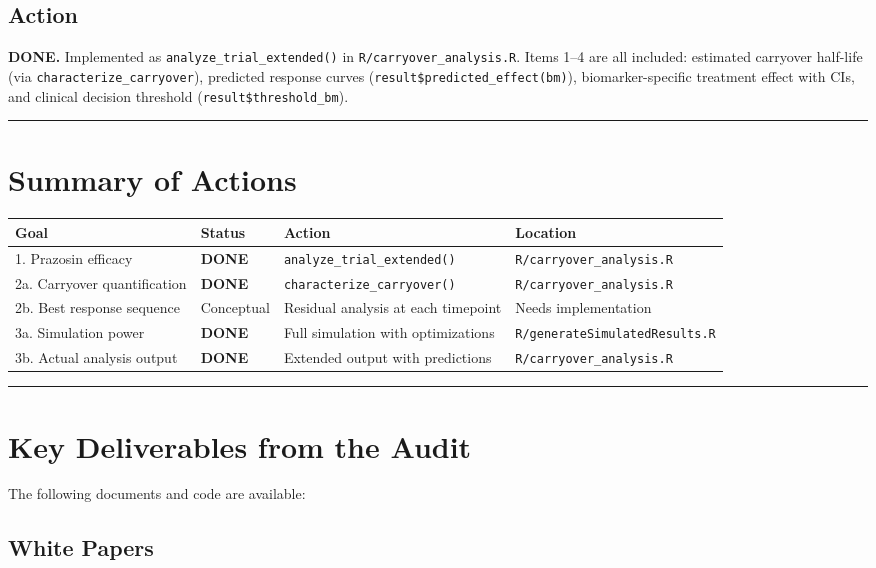\documentclass[11pt]{article}
\begin{document}
\subsection{Action}

\textbf{DONE.} Implemented as \texttt{analyze\_trial\_extended()} in
\texttt{R/carryover\_analysis.R}. Items 1--4 are all included:
estimated carryover half-life (via \texttt{characterize\_carryover}),
predicted response curves (\texttt{result\$predicted\_effect(bm)}),
biomarker-specific treatment effect with CIs, and clinical
decision threshold (\texttt{result\$threshold\_bm}).

\bigskip\noindent\rule{\textwidth}{0.4pt}\bigskip

\section{Summary of Actions}

\begin{table}[h]
\centering
\small
\begin{tabular}{llll}
\toprule
Goal & Status & Action & Location \\
\midrule
1. Prazosin efficacy & \textbf{DONE} & \texttt{analyze\_trial\_extended()} & \texttt{R/carryover\_analysis.R} \\
2a. Carryover quantification & \textbf{DONE} & \texttt{characterize\_carryover()} & \texttt{R/carryover\_analysis.R} \\
2b. Best response sequence & Conceptual & Residual analysis at each timepoint & Needs implementation \\
3a. Simulation power & \textbf{DONE} & Full simulation with optimizations & \texttt{R/generateSimulatedResults.R} \\
3b. Actual analysis output & \textbf{DONE} & Extended output with predictions & \texttt{R/carryover\_analysis.R} \\
\bottomrule
\end{tabular}
\end{table}

\bigskip\noindent\rule{\textwidth}{0.4pt}\bigskip

\section{Key Deliverables from the Audit}

The following documents and code are available:

\subsection{White Papers}
\end{document}
